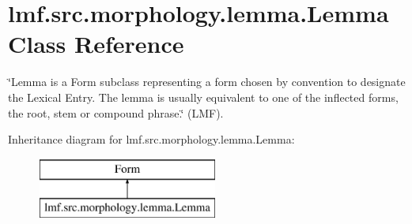 \hypertarget{classlmf_1_1src_1_1morphology_1_1lemma_1_1_lemma}{\section{lmf.\+src.\+morphology.\+lemma.\+Lemma Class Reference}
\label{classlmf_1_1src_1_1morphology_1_1lemma_1_1_lemma}
}


\char`\"{}\+Lemma is a Form subclass representing a form chosen by convention to designate the Lexical Entry. The lemma is usually equivalent to one of the inflected forms, the root, stem or compound phrase.\char`\"{} (L\+M\+F).  


Inheritance diagram for lmf.\+src.\+morphology.\+lemma.\+Lemma\+:\begin{figure}[H]
\begin{center}
\leavevmode
\includegraphics[height=2.000000cm]{classlmf_1_1src_1_1morphology_1_1lemma_1_1_lemma}
\end{center}
\end{figure}
